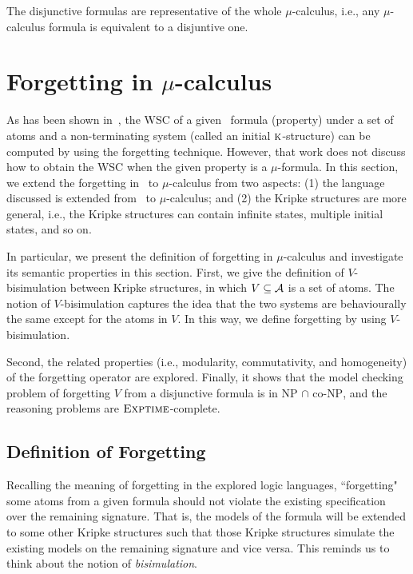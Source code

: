 \documentclass[runningheads]{llncs}
\begin{document}
The disjunctive formulas are representative of the whole $\mu$-calculus, i.e., any $\mu$-calculus formula is equivalent to a disjuntive one.



\section{Forgetting in $\mu$-calculus} \label{forgetting}
As has been shown in~\cite{renyansfirstpaper}, the WSC of a given \CTL\ formula (property) under a set of atoms and a non-terminating system (called an initial $\textsc{k}$-structure) can be computed by using the forgetting technique.
However, that work does not discuss how to obtain the WSC when the given property is a $\mu$-formula.
In this section, we extend the forgetting in \CTL\ to $\mu$-calculus from two aspects: (1) the language discussed is extended from \CTL\ to $\mu$-calculus; and
(2) the Kripke structures are more general, i.e., the Kripke structures can contain infinite states, multiple initial states, and so on.

In particular, we present the definition of forgetting in $\mu$-calculus and investigate its semantic properties in this section.
First, we give the definition of $V$-bisimulation between Kripke structures, in which $V \subseteq {\cal A}$ is a set of atoms. The notion of $V$-bisimulation captures the idea that the two systems are behaviourally the same except for the atoms in $V$. In this way, we define forgetting by using $V$-bisimulation.

Second, the related properties (i.e., modularity, commutativity, and homogeneity) of the forgetting operator are explored.
Finally, it shows that the model checking problem of forgetting $V$ from a disjunctive formula is in \textsc{NP} $\cap$ co-\textsc{NP}, and the reasoning problems are $\textsc{Exptime}$-complete.

\subsection{Definition of Forgetting}
Recalling the meaning of forgetting in the explored logic languages, ``forgetting" some atoms from  a given formula should not violate the existing specification over the remaining signature.
That is, the models of the formula will be extended to some other Kripke structures such that those Kripke structures simulate the existing models on the remaining signature and vice versa.
This reminds us to think about the notion of \emph{bisimulation}.
\end{document}
